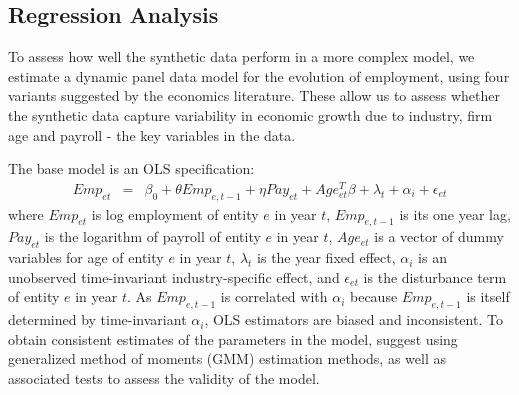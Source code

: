 










\subsection{Regression Analysis}

To assess how well the synthetic data perform in a more complex model, we estimate a dynamic panel data model for the evolution of employment, using four variants suggested by the economics literature. These allow us to assess whether the synthetic data capture variability in economic growth due to industry, firm age and payroll - the key variables in the data. 

The base model is an OLS specification:
\begin{eqnarray}	
\label{eq:OLS}
Emp_{et} & = & \beta_0 + \theta Emp_{e,t-1} + \eta Pay_{et} + Age_{et}^{T}\beta + \lambda_t + \alpha_i + \epsilon_{et}
\end{eqnarray}
where $Emp_{et}$ is log employment of entity $e$ in year $t$, $Emp_{e,t-1}$ is its one year lag, $Pay_{et}$ is the logarithm of payroll of entity $e$ in year $t$, $Age_{et}$ is a vector of dummy variables for age of entity $e$ in year $t$, $\lambda_t$ is the year fixed effect, $\alpha_i$ is an unobserved time-invariant industry-specific effect, and $\epsilon_{et}$ is the disturbance term of entity $e$ in year $t$. 
As $Emp_{e,t-1}$ is correlated with $\alpha_{i}$ because $Emp_{e,t-1}$ is itself determined by time-invariant $\alpha_{i}$, OLS estimators are biased and inconsistent. To obtain consistent estimates of the parameters in the model, \textcite{RePEc:oup:restud:v:58:y:1991:i:2:p:277-297.} suggest using  generalized method of moments (GMM) estimation methods, as well as associated tests to assess the  validity of the model.  

